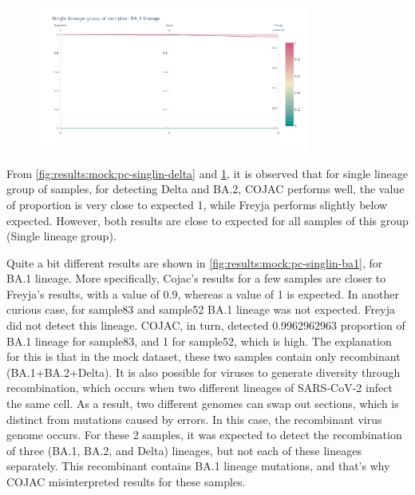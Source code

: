                 \begin{figure}[ht!]
                	\centering
                    \includegraphics[width=0.8\textwidth]{figures/results/mock/pc-singlin-ba2.png}
                    \label{fig:results:mock:pc-singlin-ba2}
                \end{figure}
                
                From \cref{fig:results:mock:pc-singlin-delta} and \cref{fig:results:mock:pc-singlin-ba2}, it is observed that for single lineage group of samples, for detecting Delta and BA.2, COJAC performs well, the value of proportion is very close to expected 1, while Freyja performs slightly below expected. However, both results are close to expected for all samples of this group (Single lineage group).

                Quite a bit different results are shown in \cref{fig:results:mock:pc-singlin-ba1}, for BA.1 lineage. More specifically, Cojac’s results for a few samples are closer to Freyja’s results, with a value of 0.9, whereas a value of 1 is expected. In another curious case, for sample83 and sample52 BA.1 lineage was not expected. Freyja did not detect this lineage. COJAC, in turn, detected 0.9962962963 proportion of BA.1 lineage for sample83, and 1 for sample52, which is high. The explanation for this is that in the mock dataset, these two samples contain only recombinant (BA.1+BA.2+Delta). It is also possible for viruses to generate diversity through recombination, which occurs when two different lineages of SARS-CoV-2 infect the same cell. As a result, two different genomes can swap out sections, which is distinct from mutations caused by errors. In this case, the recombinant virus genome occurs.
                For these 2 samples, it was expected to detect the recombination of three (BA.1, BA.2, and Delta) lineages, but not each of these lineages separately. This recombinant contains BA.1 lineage mutations, and that's why COJAC misinterpreted results for these samples.


